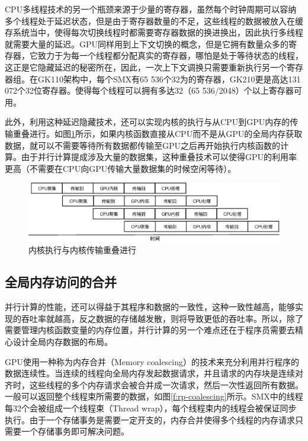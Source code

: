 CPU多线程技术的另一个瓶颈来源于少量的寄存器，虽然每个时钟周期可以容纳多个线程处于延迟状态，但是由于寄存器数量的不足，这些线程的数据被放入在缓存系统当中，使得每次切换线程时都需要寄存器数据的换进换出，因此执行多线程就需要大量的延迟。GPU同样用到上下文切换的概念，但是它拥有数量众多的寄存器，它致力于为每一个线程都分配真实的寄存器，哪怕是处于等待状态的线程，这正是它隐藏延迟的秘密所在，因此，一次上下文调换只需要重新执行另一个寄存器组。在GK110架构中，每个SMX有65 536个32为的寄存器，GK210更是高达131 072个32位寄存器。使得每个线程可以拥有多达32（65 536/2048）个以上寄存器可用。

此外，利用这种延迟隐藏技术，还可以实现内核的执行与从CPU到GPU内存的传输重叠进行。如图\ref{f:rp-streaming}所示，如果内核函数直接从CPU而不是从GPU的全局内存获取数据，就可以不需要等待所有数据都传输至GPU之后再开始执行内核函数的计算。由于并行计算提成涉及大量的数据集，这种重叠技术可以使得GPU的利用率更高（不需要在CPU向GPU传输大量数据集的时候空闲等待）。

\begin{figure}
	\includegraphics[width=1.\textwidth]{figures/rp/streaming}
	\caption{内核执行与内核传输重叠进行}
	\label{f:rp-streaming}
\end{figure}




\subsection{全局内存访问的合并}
并行计算的性能，还可以得益于其程序和数据的一致性，这种一致性越高，能够实现的吞吐率就越高，反之数据的存储越发散，则将导致更低的吞吐率。所以，除了需要管理内核函数变量的内存位置，并行计算的另一个难点还在于程序员需要去精心设计全局内存数据的布局。

GPU使用一种称为内存合并（Memory coalescing）的技术来充分利用并行程序的数据连续性。当连续的线程向全局内存发起数据请求，并且请求的内存块是连续对齐时，这些线程的多个内存请求会被合并成一次请求，然后一次性返回所有数据。一般可以返回整个线程束所需要的数据，如图\ref{f:rp-coalescing}所示。SMX中的线程每32个会被组成一个线程束（Thread wrap），每个线程束内的线程会被保证同步执行。由于一个存储事务是需要一定开支的，内存合并使得多个线程的内存请求只需要一个存储事务即可解决问题。

